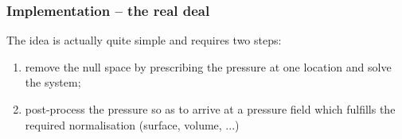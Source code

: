\subsubsection{Implementation -- the real deal}

The idea is actually quite simple and requires two steps:
\begin{enumerate}
\item remove the null space by prescribing the pressure at one location and solve the system;
\item post-process the pressure so as to arrive at a pressure field which fulfills the required normalisation (surface, volume, ...)
\end{enumerate}







